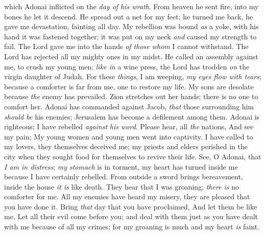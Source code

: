 \begin{biblechapter}
which Adonai inflicted 
on the \textit{day of his wrath}.
\verse From heaven he sent fire, 
into my bones he let it descend. 
He spread out a net for my feet; 
he turned me back, 
he gave me devastation, 
fainting all day.
\verse My rebellion was bound \textit{as} a yoke, 
with his hand it was fastened together; 
it was put on my neck 
\textit{and} caused my strength to fail. 
The Lord gave me into the hands 
\textit{of those whom} I cannot withstand.
\verse The Lord has rejected 
all my mighty ones in my midst. 
He called an assembly against me, 
to crush my young men; 
\textit{like in} a wine press, 
the Lord has trodden \textit{on} 
the virgin daughter of Judah.
\verse For these \textit{things}, I am weeping, 
\textit{my eyes flow with tears}; 
because a comforter is far from me, 
one to restore my life. 
My sons are desolate 
because \textit{the} enemy has prevailed.
\verse Zion stretches out her hands; 
there is no one to comfort her. 
Adonai has commanded against Jacob, 
\textit{that} those surrounding him \textit{should be} his enemies; 
Jerusalem has become 
a defilement among them.
\verse Adonai is righteous; 
I have rebelled \textit{against} \textit{his word}. 
Please hear, all \textit{the} nations, 
And see my pain; 
My young women and young men 
went into captivity.
\verse I have called to my lovers, 
they themselves deceived me; 
my priests and elders perished in the city 
when they sought food for themselves 
to revive their life.
\verse See, O Adonai, that \textit{I am in distress}; 
\textit{my stomach} is in torment, 
my heart has turned inside me 
because I have certainly rebelled. 
From outside a sword brings bereavement, 
inside the house \textit{it is} like death.
\verse They hear that I was groaning; 
\textit{there is} no comforter for me. 
All my enemies have heard my misery, 
they are pleased that you have done it. 
Bring \textit{that} day that you have proclaimed, 
And let them be like me.
\verse Let all their evil come before you; 
and deal with them 
just as you have dealt with me 
because of all my crimes; 
for my groaning is much and my heart \textit{is} faint.
\end{biblechapter}

